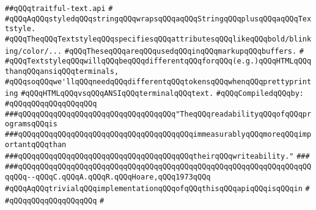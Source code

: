 \label{src/lib/prettyprint/big/src/traitful-text.api}
\verb|##qQQqtraitful-text.api|\newline
\verb|#|\newline
\verb|#qQQqAqQQqstyledqQQqstringqQQqwrapsqQQqaqQQqStringqQQqplusqQQqaqQQqTextstyle.|\newline
\verb|#qQQqTheqQQqTextstyleqQQqspecifiesqQQqattributesqQQqlikeqQQqbold/blinking/color/...|\newline
\verb|#qQQqTheseqQQqareqQQqusedqQQqinqQQqmarkupqQQqbuffers.|\newline
\verb|#|\newline
\verb|#qQQqTextstyleqQQqwillqQQqbeqQQqdifferentqQQqforqQQq(e.g.)qQQqHTMLqQQqthanqQQqansiqQQqterminals,|\newline
\verb|#qQQqsoqQQqwe'llqQQqneedqQQqdifferentqQQqtokensqQQqwhenqQQqprettyprinting|\newline
\verb|#qQQqHTMLqQQqvsqQQqANSIqQQqterminalqQQqtext.|\newline
\newline
\verb|#qQQqCompiledqQQqby:|\newline
\verb|#qQQqqQQqqQQqqQQqqQQq|\newline
\newline
\newline
\newline
\verb|###qQQqqQQqqQQqqQQqqQQqqQQqqQQqqQQqqQQq"TheqQQqreadabilityqQQqofqQQqprogramsqQQqis|\newline
\verb|###qQQqqQQqqQQqqQQqqQQqqQQqqQQqqQQqqQQqqQQqimmeasurablyqQQqmoreqQQqimportantqQQqthan|\newline
\verb|###qQQqqQQqqQQqqQQqqQQqqQQqqQQqqQQqqQQqqQQqtheirqQQqwriteability."|\newline
\verb|###|\newline
\verb|###qQQqqQQqqQQqqQQqqQQqqQQqqQQqqQQqqQQqqQQqqQQqqQQqqQQqqQQqqQQqqQQqqQQqqQQq--qQQqC.qQQqA.qQQqR.qQQqHoare,qQQq1973qQQq|\newline
\newline
\newline
\verb|#qQQqAqQQqtrivialqQQqimplementationqQQqofqQQqthisqQQqapiqQQqisqQQqin|\newline
\verb|#|\newline
\verb|#qQQqqQQqqQQqqQQqqQQq|\newline
\verb|#|\newline
